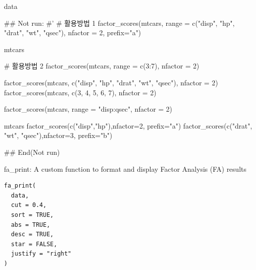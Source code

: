 \documentclass[a4paper]{book}
\begin{document}
%
\begin{Value}
data
\end{Value}
%
\begin{Examples}
\begin{ExampleCode}


## Not run: 
#'
# 활용방법 1
factor_scores(mtcars,
              range = c("disp", "hp", "drat", "wt", "qsec"),
              nfactor = 2, prefix="a")

mtcars %

# 활용방법 2
factor_scores(mtcars, range = c(3:7), nfactor = 2)

factor_scores(mtcars, c("disp", "hp", "drat", "wt", "qsec"), nfactor = 2)
factor_scores(mtcars, c(3, 4, 5, 6, 7), nfactor = 2)

factor_scores(mtcars, range = "disp:qsec", nfactor = 2)


mtcars %
  factor_scores(c("disp","hp"),nfactor=2, prefix="a") %
  factor_scores(c("drat", "wt", "qsec"),nfactor=3, prefix="b") %


## End(Not run)
\end{ExampleCode}
\end{Examples}
%
\begin{Description}
fa\_print: A custom function to format and display Factor Analysis (FA) results
\end{Description}
%
\begin{Usage}
\begin{verbatim}
fa_print(
  data,
  cut = 0.4,
  sort = TRUE,
  abs = TRUE,
  desc = TRUE,
  star = FALSE,
  justify = "right"
)
\end{verbatim}
\end{Usage}
%
\end{document}
